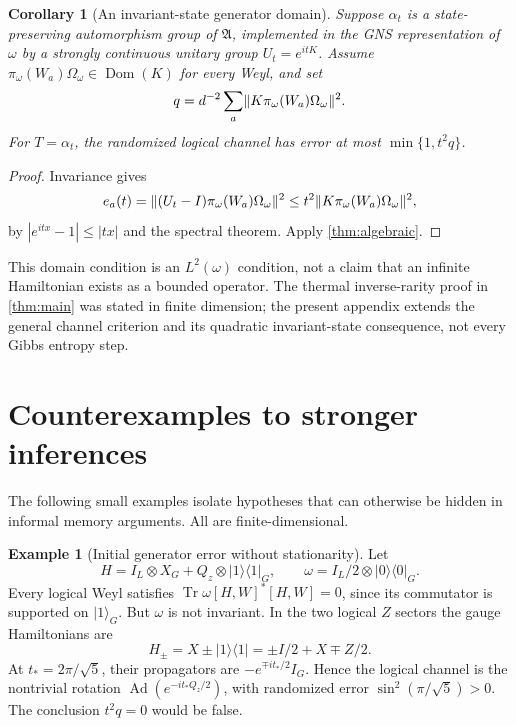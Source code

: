 \documentclass[11pt,reqno]{amsart}
\numberwithin{equation}{section}
\newtheorem{corollary}[theorem]{Corollary}
\theoremstyle{definition}
\newtheorem{example}[theorem]{Example}
\theoremstyle{remark}
\newcommand{\Tr}{\operatorname{Tr}}
\newcommand{\Ad}{\operatorname{Ad}}
\DeclarePairedDelimiter{\norm}{\lVert}{\rVert}
\DeclareMathOperator{\Dom}{Dom}
\begin{document}
\begin{corollary}[An invariant-state generator domain]\label{cor:gns}
Suppose \(\alpha_t\) is a state-preserving automorphism group of
\(\mathfrak A\), implemented in the GNS representation of \(\omega\)
by a strongly continuous unitary group \(U_t=e^{itK}\).
Assume \(\pi_\omega(W_a)\Omega_\omega\in\Dom(K)\) for every Weyl, and set
\[
             q=d^{-2}\sum_a
                    \norm{K\pi_\omega(W_a)\Omega_\omega}^2.
\]
For \(T=\alpha_t\), the randomized logical channel has error at most
\(\min\{1,t^2q\}\).
\end{corollary}
\begin{proof}
Invariance gives
\[
 e_a(t)=
 \norm{(U_t-I)\pi_\omega(W_a)\Omega_\omega}^2
 \le t^2\norm{K\pi_\omega(W_a)\Omega_\omega}^2,
\]
by \(|e^{itx}-1|\le|tx|\) and the spectral theorem.
Apply \cref{thm:algebraic}.
\end{proof}

This domain condition is an \(L^2(\omega)\) condition, not a claim that
an infinite Hamiltonian exists as a bounded operator. The thermal
inverse-rarity proof in \cref{thm:main} was stated in finite dimension;
the present appendix extends the general channel criterion and its
quadratic invariant-state consequence, not every Gibbs entropy step.

\section{Counterexamples to stronger inferences}\label{app:obstructions}

The following small examples isolate hypotheses that can otherwise be
hidden in informal memory arguments. All are finite-dimensional.

\begin{example}[Initial generator error without stationarity]
\label{ex:nonstationary}
Let
\[
 H=I_L\otimes X_G+Q_z\otimes |1\rangle\langle1|_G,\qquad
 \omega=I_L/2\otimes |0\rangle\langle0|_G .
\]
Every logical Weyl satisfies
\(\Tr\omega[H,W]^*[H,W]=0\), since its commutator is supported on
\(|1\rangle_G\). But \(\omega\) is not invariant.
In the two logical \(Z\) sectors the gauge Hamiltonians are
\[
 H_\pm=X\pm|1\rangle\langle1|
       =\pm I/2+X\mp Z/2.
\]
At \(t_*=2\pi/\sqrt5\), their propagators are
\(-e^{\mp it_*/2}I_G\). Hence the logical channel is the nontrivial
rotation \(\Ad(e^{-it_*Q_z/2})\), with randomized error
\(\sin^2(\pi/\sqrt5)>0\). The conclusion \(t^2q=0\) would be false.
\end{example}
\end{document}
